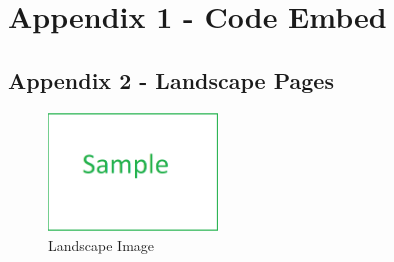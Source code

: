 \chapter{Appendix 1 - Code Embed}
\label{app1}
\begin{landscape} 
\chapter{Appendix 2 - Landscape Pages}
\begin{figure}[th!]
    \centering
    \includegraphics[width=0.4\textwidth]{Sample1.png}
    \caption{Landscape Image
    \cite{specreport}}
    \label{fig:gantt}
\end{figure}
\end{landscape}

